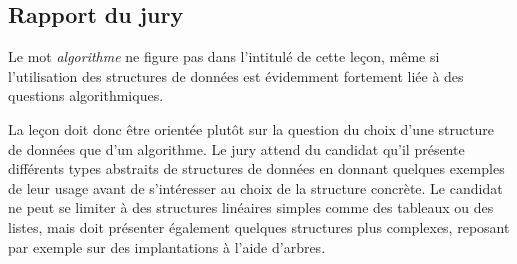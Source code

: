 \documentclass[../../Agregation.tex]{subfiles}
\begin{document}

\subsection{Rapport du jury}

\begin{aquote}{}
Le mot \emph{algorithme} ne figure pas dans l'intitulé de cette leçon, même si l'utilisation des structures de données est évidemment fortement liée à des questions algorithmiques.

La leçon doit donc être orientée plutôt sur la question du choix d'une structure de données que d'un algorithme. Le jury attend du candidat qu'il présente différents types abstraits de structures de données en donnant quelques exemples de leur usage avant de s'intéresser au choix de la structure concrète. Le candidat ne peut se limiter à des structures linéaires simples comme des tableaux ou des listes, mais doit présenter également quelques structures plus complexes, reposant par exemple sur des implantations à l'aide d'arbres.
\end{aquote}
\end{document}
